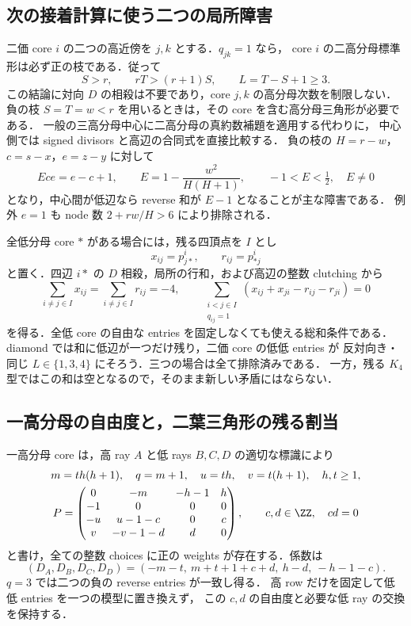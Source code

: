 \subsection{次の接着計算に使う二つの局所障害}
\label{ng15:local-obstructions}

二価 core $i$ の二つの高近傍を $j,k$ とする．$q_{jk}=1$ なら，
core $i$ の二高分母標準形は必ず正の枝である．従って
\[
 S>r,\qquad rT>(r+1)S,\qquad L=T-S+1\geq3.
\]
この結論に対向 $D$ の相殺は不要であり，core $j,k$ の高分母次数を制限しない．
負の枝 $S=T=w<r$ を用いるときは，その core を含む高分母三角形が必要である．
一般の三高分母中心に二高分母の真約数補題を適用する代わりに，
中心側では signed divisors と高辺の合同式を直接比較する．
負の枝の $H=r-w$，$c=s-x$，$e=z-y$ に対して
\[
 Ece=e-c+1,\qquad E=1-\frac{w^2}{H(H+1)},
 \qquad -1<E<\tfrac12,\quad E\ne0
\]
となり，中心間が低辺なら reverse 和が $E-1$ となることが主な障害である．
例外 $e=1$ も node 数 $2+rw/H>6$ により排除される．

全低分母 core $*$ がある場合には，残る四頂点を $I$ とし
\[
 x_{ij}=p^i_{j*},\qquad r_{ij}=p^i_{*j}
\]
と置く．四辺 $i*$ の $D$ 相殺，局所の行和，および高辺の整数 clutching から
\[
 \sum_{i\ne j\in I}x_{ij}=\sum_{i\ne j\in I}r_{ij}=-4,
 \qquad
 \sum_{\substack{i<j\in I\\q_{ij}=1}}
 (x_{ij}+x_{ji}-r_{ij}-r_{ji})=0
\]
を得る．全低 core の自由な entries を固定しなくても使える総和条件である．
diamond では和に低辺が一つだけ残り，二価 core の低低 entries が
反対向き・同じ $L\in\{1,3,4\}$ にそろう．三つの場合は全て排除済みである．
一方，残る $K_4$ 型ではこの和は空となるので，そのまま新しい矛盾にはならない．

\subsection{一高分母の自由度と，二葉三角形の残る割当}
\label{ng15:leaf-data}

一高分母 core は，高 ray $A$ と低 rays $B,C,D$ の適切な標識により
\[
\begin{gathered}
 m=th(h+1),\quad q=m+1,\quad u=th,\quad v=t(h+1),
 \quad h,t\geq1,\\
 P=\begin{pmatrix}
 0&-m&-h-1&h\\
 -1&0&0&0\\
 -u&u-1-c&0&c\\
 v&-v-1-d&d&0
 \end{pmatrix},\qquad c,d\in\ZZ,\quad cd=0
\end{gathered}
\]
と書け，全ての整数 choices に正の weights が存在する．係数は
\[
 (D_A,D_B,D_C,D_D)=(-m-t,\ m+t+1+c+d,\ h-d,\ -h-1-c).
\]
$q=3$ では二つの負の reverse entries が一致し得る．
高 row だけを固定して低低 entries を一つの模型に置き換えず，
この $c,d$ の自由度と必要な低 ray の交換を保持する．

